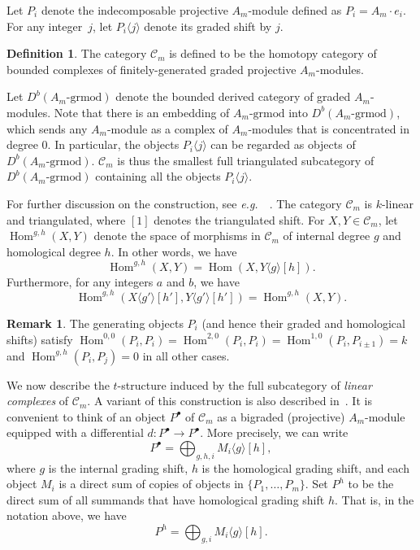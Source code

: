 \documentclass{amsart}
\theoremstyle{definition}
\newtheorem{definition}[theorem]{Definition}
\newtheorem{remark}[theorem]{Remark}
\DeclareMathOperator{\Hom}{Hom} %
\newcommand{\eg}{\textit{e.g.}~} %
\newcommand{\darkblue}{\color{darkblue}} %
\newcommand{\defn}[1]{\textsl{\darkblue #1}} %
\begin{document}
Let \(P_i\) denote the indecomposable projective \(A_m\)-module defined as \(P_i = A_m\cdot e_i\).
For any integer~\(j\), let \(P_i \langle j \rangle\) denote its graded shift by \(j\).

\begin{definition}
The category \(\mathcal{C}_m\) is defined to be the homotopy category of bounded complexes of finitely-generated graded projective \(A_m\)-modules.
\end{definition}
Let \(D^b(A_m\text{-grmod})\) denote the bounded derived category of graded \(A_m\)-modules.
Note that there is an embedding of \(A_m\text{-grmod}\) into \(D^b(A_m\text{-grmod})\), which sends any \(A_m\)-module as a complex of \(A_m\)-modules that is concentrated in degree \(0\).
In particular, the objects \(P_i\langle j \rangle\) can be regarded as objects of \(D^b(A_m\text{-grmod})\).
\(\mathcal{C}_m\) is thus the smallest full triangulated subcategory of \(D^b(A_m\text{-grmod})\) containing all the objects \(P_i\langle j \rangle\).

For further discussion on the construction, see \eg~\cite[Sect.~2.3.3]{bap.deo.lic:22}.
The category \(\mathcal{C}_m\) is \(k\)-linear and triangulated, where \([1]\) denotes the triangulated shift.
For \(X, Y \in \mathcal{C}_m\), let \(\Hom^{g,h}(X,Y)\) denote the space of morphisms in \(\mathcal{C}_m\) of internal degree \(g\) and homological degree \(h\).
In other words, we have
\[
\Hom^{g,h}(X,Y) = \Hom(X,Y\langle g \rangle[h]).
\]
Furthermore, for any integers \(a\) and \(b\), we have
\[
\Hom^{g,h}(X\langle g' \rangle[h'], Y\langle g' \rangle[h']) = \Hom^{g,h}(X,Y).
\]

\begin{remark}
\label{rem:generating-morphisms}
The generating objects \(P_i\) (and hence their graded and homological shifts) satisfy \(\Hom^{0,0}(P_i,P_i) = \Hom^{2,0}(P_i,P_i) = \Hom^{1,0}(P_i,P_{i\pm1}) = k\) and \(\Hom^{g,h}(P_i, P_j) = 0\) in all other cases.
\end{remark}

We now describe the \(t\)-structure induced by the full subcategory of \defn{linear complexes} of \(\mathcal{C}_m\).
A variant of this construction is also described in~\cite[Sect.~2.5]{lic.que:21}.
It is convenient to think of an object \(P^{\bullet}\) of \(\mathcal{C}_m\) as a bigraded (projective) \(A_m\)-module equipped with a differential \(d \colon P^{\bullet} \to P^{\bullet}\).
More precisely, we can write
\[
P^{\bullet} = \bigoplus_{g,h,i} M_i\langle g \rangle[h],
\]
where \(g\) is the internal grading shift, \(h\) is the homological grading shift, and 
each object \(M_i\) is a direct sum of copies of objects in \(\{P_1,\ldots, P_m\}\).
Set \(P^h\) to be the direct sum of all summands that have homological grading shift \(h\).
That is, in the notation above, we have
\[
P^{h} = \bigoplus_{g,i} M_i\langle g \rangle[h].
\]
\end{document}
